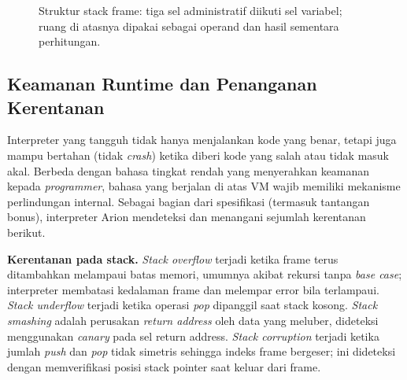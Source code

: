 \begin{figure}[H]
\centering
{}
\caption{Struktur stack frame: tiga sel administratif diikuti sel variabel; ruang
di atasnya dipakai sebagai operand dan hasil sementara perhitungan.}
\label{fig:frame}
\end{figure}

\subsection{Keamanan Runtime dan Penanganan Kerentanan}

Interpreter yang tangguh tidak hanya menjalankan kode yang benar, tetapi juga
mampu bertahan (tidak \emph{crash}) ketika diberi kode yang salah atau tidak
masuk akal. Berbeda dengan bahasa tingkat rendah yang menyerahkan keamanan kepada
\emph{programmer}, bahasa yang berjalan di atas VM wajib memiliki mekanisme
perlindungan internal. Sebagai bagian dari spesifikasi (termasuk tantangan bonus),
interpreter Arion mendeteksi dan menangani sejumlah kerentanan berikut.

\textbf{Kerentanan pada stack.} \emph{Stack overflow} terjadi ketika frame terus
ditambahkan melampaui batas memori, umumnya akibat rekursi tanpa \emph{base case};
interpreter membatasi kedalaman frame dan melempar error bila terlampaui.
\emph{Stack underflow} terjadi ketika operasi \emph{pop} dipanggil saat stack
kosong. \emph{Stack smashing} adalah perusakan \emph{return address} oleh data yang
meluber, dideteksi menggunakan \emph{canary} pada sel return address.
\emph{Stack corruption} terjadi ketika jumlah \emph{push} dan \emph{pop} tidak
simetris sehingga indeks frame bergeser; ini dideteksi dengan memverifikasi posisi
stack pointer saat keluar dari frame.

